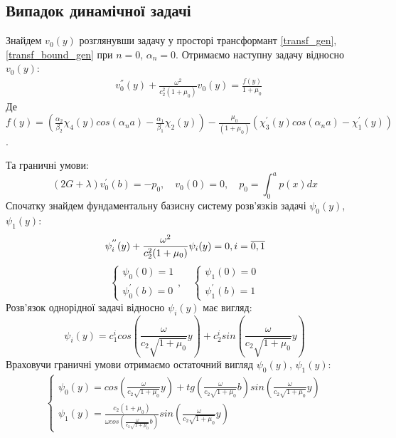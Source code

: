\subsection*{Випадок динамічної задачі}
Знайдем $v_0(y)$ розглянувши задачу у просторі трансформант \eqref{transf_gen}, \eqref{transf_bound_gen} при $n=0$, $\alpha_n = 0$.
Отримаємо наступну задачу відносно $v_0(y)$:
\begin{align*}
    &v_0^{''}(y) + \frac{\omega^2}{c_2^2(1+\mu_0) }v_0(y) = \frac{f(y)}{1+\mu_0}
\end{align*}
Де $f(y)=(\frac{\alpha_2}{\beta_2}\chi_4(y) cos(\alpha_n a) - \frac{\alpha_1}{\beta_1}\chi_2(y)) - \frac{\mu_0}{(1+\mu_0)} (\chi_3^{'}(y) cos(\alpha_n a) -\chi_1^{'}(y))$.

Та граничні умови:
\begin{equation*}
    (2G + \lambda)v_0^{'}(b) = -p_0, \quad v_0(0) = 0, \quad p_0 = \int_{0}^{a}p(x)dx
\end{equation*}
Спочатку знайдем фундаментальну базисну систему розв'язків задачі $\psi_0(y)$, $\psi_1(y)$:
\begin{equation*}
    \psi_i^{''}(y) + \frac{\omega^2}{c_2^2(1+\mu_0) }\psi_i(y) = 0, i=\overline{0,1} \\
\end{equation*}
\begin{equation*}
    \begin{cases}
        \psi_0(0) = 1 \\
        \psi_0^{'}(b) = 0
    \end{cases}, \quad
    \begin{cases}
        \psi_1(0) = 0 \\
        \psi_1^{'}(b) = 1
    \end{cases}
\end{equation*}
Розв'язок однорідної задачі відносно $\psi_i(y)$ має вигляд:
\begin{equation}
    \psi_i(y) = c_1^i cos\left( \frac{\omega}{c_2 \sqrt{1 + \mu_0}} y \right) + c_2^i sin\left( \frac{\omega}{c_2 \sqrt{1 + \mu_0}} y \right)
\end{equation}
Враховучи граничні умови отримаємо остаточний вигляд $\psi_0(y)$, $\psi_1(y)$:
\begin{align*}
    \begin{cases}
        \psi_0(y) = cos\left( \frac{\omega}{c_2 \sqrt{1 + \mu_0}} y \right) +  tg\left( \frac{\omega}{c_2 \sqrt{1 + \mu_0}} b \right) sin\left( \frac{\omega}{c_2 \sqrt{1 + \mu_0}} y \right) \\
        \psi_1(y) = \frac{c_2 (1 + \mu_0)}{\omega cos\left( \frac{\omega}{c_2 \sqrt{1 + \mu_0}} b \right)} sin\left( \frac{\omega}{c_2 \sqrt{1 + \mu_0}} y \right)
    \end{cases}
\end{align*}
